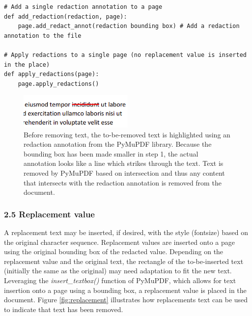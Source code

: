 \begin{lstlisting}[style=CStyle, caption=Pseudocode for using the bounding boxes defined in the previous step as argument in the \textit{add\_redact\_annot()} PyMuPDF function and then applying them which removes any content from the selected area.]
# Add a single redaction annotation to a page
def add_redaction(redaction, page):
    page.add_redact_annot(redaction bounding box) # Add a redaction annotation to the file

# Apply redactions to a single page (no replacement value is inserted in the place)
def apply_redactions(page):
    page.apply_redactions()

\end{lstlisting}

\begin{figure}[h]
\includegraphics[width=0.5\textwidth]{latex/media/redactannot.png}
\centering
\caption{Before removing text, the to-be-removed text is highlighted using an redaction annotation from the PyMuPDF library. Because the bounding box has been made smaller in step 1, the actual annotation looks like a line which strikes through the text. Text is removed by PyMuPDF based on intersection and thus any content that intersects with the redaction annotation is removed from the document.}
\label{fig:redactannot1}
\end{figure}
\subsubsection{2.5 Replacement value}
A replacement text may be inserted, if desired, with the style (fontsize) based on the original character sequence. Replacement values are inserted onto a page using the original bounding box of the redacted value. Depending on the replacement value and the original text, the rectangle of the to-be-inserted text (initially the same as the original) may need adaptation to fit the new text. Leveraging the \textit{insert\_textbox()} function of PyMuPDF, which allows for text insertion onto a page using a bounding box, a replacement value is placed in the document. Figure \ref{fig:replacement} illustrates how replacements text can be used to indicate that text has been removed.

